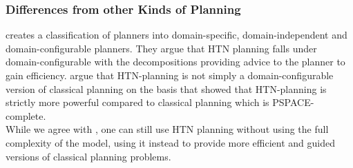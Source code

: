 \subsubsection{Differences from other Kinds of Planning}
\label{prelim: planning differences}
\cite{nau2007current} creates a classification of planners into domain-specific, domain-independent and domain-configurable planners.
They argue that HTN planning falls under domain-configurable with the decompositions providing advice to the planner to gain efficiency.
\cite{holler2020htn} argue that HTN-planning is not simply a domain-configurable version of classical planning on the basis that \cite{erol1994htn, erol1996complexity} showed that HTN-planning is strictly more powerful compared to classical planning which is PSPACE-complete. \\
While we agree with \cite{holler2020htn}, one can still use HTN planning without using the full complexity of the model, using it instead to provide more efficient and guided versions of classical planning problems.


